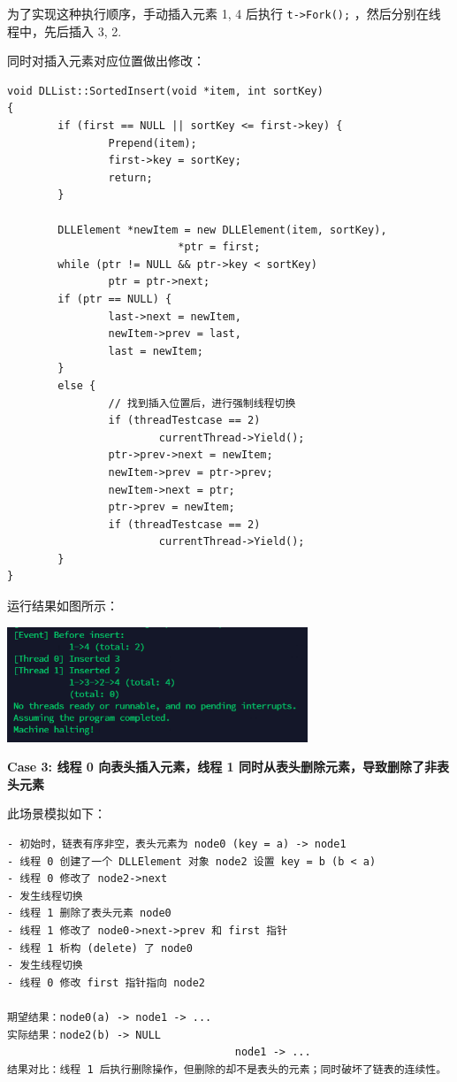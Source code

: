 \documentclass[a4paper,12pt]{article}
\begin{document}
\par 为了实现这种执行顺序，手动插入元素 1, 4 后执行 \texttt{t->Fork();} ，然后分别在线程中，先后插入 3, 2.
\par 同时对插入元素对应位置做出修改：

\begin{verbatim}
void DLList::SortedInsert(void *item, int sortKey) 
{ 
        if (first == NULL || sortKey <= first->key) { 
                Prepend(item); 
                first->key = sortKey; 
                return; 
        } 
 
        DLLElement *newItem = new DLLElement(item, sortKey), 
                           *ptr = first; 
        while (ptr != NULL && ptr->key < sortKey) 
                ptr = ptr->next; 
        if (ptr == NULL) { 
                last->next = newItem, 
                newItem->prev = last, 
                last = newItem; 
        } 
        else { 
                // 找到插入位置后，进行强制线程切换
                if (threadTestcase == 2) 
                        currentThread->Yield(); 
                ptr->prev->next = newItem; 
                newItem->prev = ptr->prev; 
                newItem->next = ptr; 
                ptr->prev = newItem; 
                if (threadTestcase == 2) 
                        currentThread->Yield(); 
        } 
}
\end{verbatim}

\par 运行结果如图所示：
\begin{center}
\includegraphics[width=9cm]{images/result/7.png}
\end{center}

\par\textbf{Case 3: 线程 0 向表头插入元素，线程 1 同时从表头删除元素，导致删除了非表头元素}
\par 此场景模拟如下：
\begin{verbatim}
- 初始时，链表有序非空，表头元素为 node0 (key = a) -> node1
- 线程 0 创建了一个 DLLElement 对象 node2 设置 key = b (b < a)
- 线程 0 修改了 node2->next
- 发生线程切换
- 线程 1 删除了表头元素 node0
- 线程 1 修改了 node0->next->prev 和 first 指针
- 线程 1 析构 (delete) 了 node0
- 发生线程切换
- 线程 0 修改 first 指针指向 node2

期望结果：node0(a) -> node1 -> ...
实际结果：node2(b) -> NULL
                                    node1 -> ...
结果对比：线程 1 后执行删除操作，但删除的却不是表头的元素；同时破坏了链表的连续性。
\end{verbatim}
\end{document}
